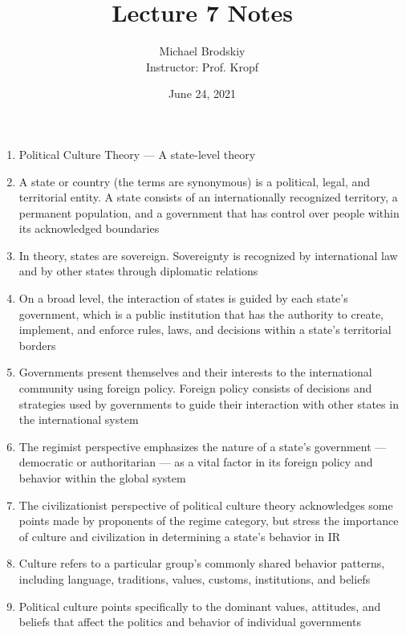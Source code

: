 \documentclass[12pt]{article}
\title{Lecture 7 Notes}
\date{June 24, 2021}
\author{Michael Brodskiy\\ \small Instructor: Prof. Kropf}
\begin{document}
    \maketitle

    \begin{enumerate}

      \item Political Culture Theory — A state-level theory

      \item A state or country (the terms are synonymous) is a political, legal, and territorial entity. A state consists of an internationally recognized territory, a permanent population, and a government that has control over people within its acknowledged boundaries

      \item In theory, states are sovereign. Sovereignty is recognized by international law and by other states through diplomatic relations

      \item On a broad level, the interaction of states is guided by each state's government, which is a public institution that has the authority to create, implement, and enforce rules, laws, and decisions within a state's territorial borders

      \item Governments present themselves and their interests to the international community using foreign policy. Foreign policy consists of decisions and strategies used by governments to guide their interaction with other states in the international system

      \item The regimist perspective emphasizes the nature of a state's government — democratic or authoritarian — as a vital factor in its foreign policy and behavior within the global system

      \item The civilizationist perspective of political culture theory acknowledges some points made by proponents of the regime category, but stress the importance of culture and civilization in determining a state's behavior in IR

      \item Culture refers to a particular group's commonly shared behavior patterns, including language, traditions, values, customs, institutions, and beliefs

      \item Political culture points specifically to the dominant values, attitudes, and beliefs that affect the politics and behavior of individual governments


\end{enumerate}
\end{document}
